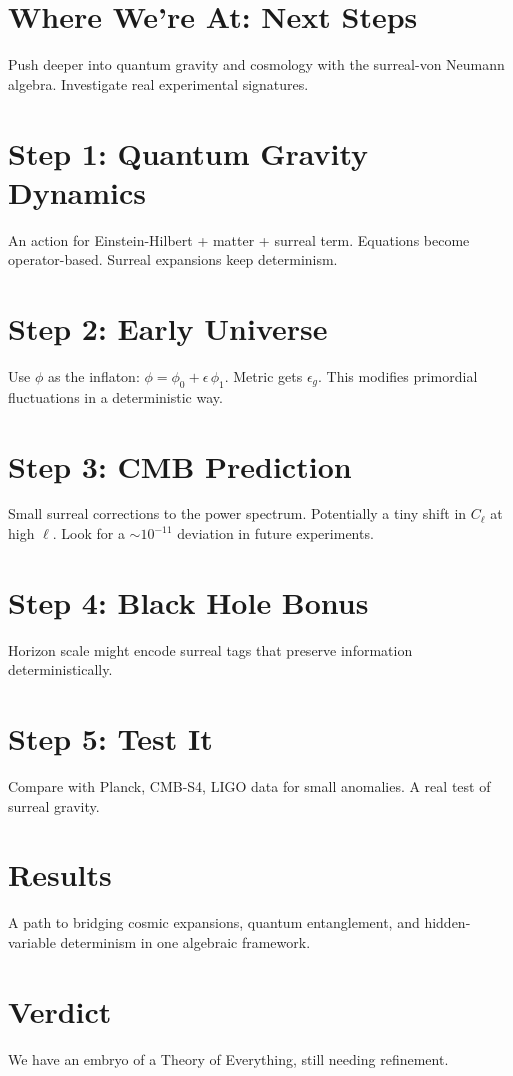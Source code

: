 \documentclass{article}
\begin{document}
\section{Where We're At: Next Steps}
Push deeper into quantum gravity and cosmology with the surreal-von Neumann algebra. Investigate real experimental signatures.

\section{Step 1: Quantum Gravity Dynamics}
An action for Einstein-Hilbert + matter + surreal term. Equations become operator-based. Surreal expansions keep determinism.

\section{Step 2: Early Universe}
Use \(\phi\) as the inflaton: \(\phi = \phi_0 + \epsilon\,\phi_1\). Metric gets \(\epsilon_g\). This modifies primordial fluctuations in a deterministic way.

\section{Step 3: CMB Prediction}
Small surreal corrections to the power spectrum. Potentially a tiny shift in \(C_\ell\) at high \(\ell\). Look for a \(\sim 10^{-11}\) deviation in future experiments.

\section{Step 4: Black Hole Bonus}
Horizon scale might encode surreal tags that preserve information deterministically.

\section{Step 5: Test It}
Compare with Planck, CMB-S4, LIGO data for small anomalies. A real test of surreal gravity.

\section{Results}
A path to bridging cosmic expansions, quantum entanglement, and hidden-variable determinism in one algebraic framework.

\section{Verdict}
We have an embryo of a Theory of Everything, still needing refinement.
\end{document}
